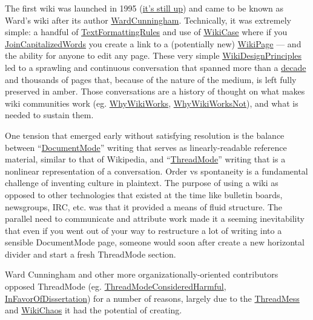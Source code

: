 The first wiki was launched in 1995
(\href{http://wiki.c2.com/}{it's still up}) and came to be known as
Ward's wiki after its author
\href{http://wiki.c2.com/?WardCunningham}{WardCunningham}. Technically,
it was extremely simple: a handful of
\href{http://wiki.c2.com/?TextFormattingRules}{TextFormattingRules} and
use of \href{http://wiki.c2.com/?WikiCase}{WikiCase} where if you
\href{http://wiki.c2.com/?JoinCapitalizedWords}{JoinCapitalizedWords}
you create a link to a (potentially new)
\href{http://wiki.c2.com/?WikiPage}{WikiPage} --- and the ability for
anyone to edit any page. These very simple
\href{http://wiki.c2.com/?WikiDesignPrinciples}{WikiDesignPrinciples}
led to a sprawling and continuous conversation that spanned more than a
\href{http://wiki.c2.com/?WardsWikiTenthAnniversary}{decade} and
thousands of pages that, because of
the nature of the medium, is left fully preserved in amber. Those
conversations are a history of thought on what makes wiki communities
work (eg. \href{http://wiki.c2.com/?WhyWikiWorks}{WhyWikiWorks},
\href{http://wiki.c2.com/?WhyWikiWorksNot}{WhyWikiWorksNot}), and what
is needed to sustain them.

One tension that emerged early without satisfying resolution is the
balance between
``\href{http://wiki.c2.com/?DocumentMode}{DocumentMode}'' writing that
serves as linearly-readable reference material, similar to that of
Wikipedia, and ``\href{http://wiki.c2.com/?ThreadMode}{ThreadMode}''
writing that is a nonlinear representation of a conversation. Order vs
spontaneity is a fundamental challenge of inventing culture in
plaintext. The purpose of using a wiki as opposed to other technologies
that existed at the time like bulletin boards, newsgroups, IRC, etc. was
that it provided a means of fluid structure. The parallel
need to communicate and attribute work made it a seeming inevitability
that even if you went out of your way to restructure a lot of writing
into a sensible DocumentMode page, someone would soon after create a new
horizontal divider and start a fresh ThreadMode section.

Ward Cunningham and other more organizationally-oriented contributors
opposed ThreadMode (eg.
\href{http://wiki.c2.com/?ThreadModeConsideredHarmful}{ThreadModeConsideredHarmful},
\href{http://wiki.c2.com/?InFavorOfDissertation}{InFavorOfDissertation})
for a number of reasons, largely due to the
\href{http://wiki.c2.com/?ThreadMess}{ThreadMess} and
\href{http://wiki.c2.com/?WikiChaos}{WikiChaos} it had the potential of
creating.

